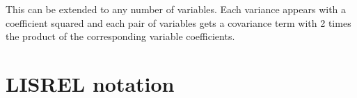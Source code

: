 \documentclass[
]{book}
\begin{document}
This can be extended to any number of variables. Each variance appears with a coefficient squared and each pair of variables gets a covariance term with 2 times the product of the corresponding variable coefficients.

\hypertarget{appendix-lisrel}{%
\chapter{LISREL notation}\label{appendix-lisrel}}

  
\end{document}
